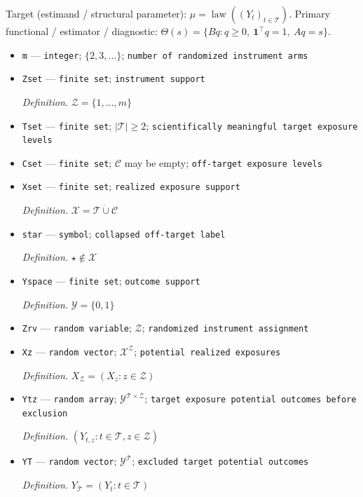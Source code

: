 \documentclass{article}
\begin{document}
Target (estimand / structural parameter): \(\mu=\operatorname{law}((Y_t)_{t\in\mathcal T})\).
Primary functional / estimator / diagnostic: \(\Theta(s)=\{Bq:q\ge0,\ \mathbf 1^\top q=1,\ Aq=s\}\).
\begin{itemize}
  \item \texttt{m} --- \texttt{integer}; \(\{2,3,\ldots\}\); \texttt{number of randomized instrument arms}
  \item \texttt{Zset} --- \texttt{finite set}; \texttt{instrument support}
  \par\smallskip\noindent\emph{Definition.} \(\mathcal Z=\{1,\ldots,m\}\)
  \item \texttt{Tset} --- \texttt{finite set}; \(|\mathcal T|\ge 2\); \texttt{scientifically meaningful target exposure levels}
  \item \texttt{Cset} --- \texttt{finite set}; \(\mathcal C\) may be empty; \texttt{off-\allowbreak{}target exposure levels}
  \item \texttt{Xset} --- \texttt{finite set}; \texttt{realized exposure support}
  \par\smallskip\noindent\emph{Definition.} \(\mathcal X=\mathcal T\mathbin{\dot\cup}\mathcal C\)
  \item \texttt{star} --- \texttt{symbol}; \texttt{collapsed off-\allowbreak{}target label}
  \par\smallskip\noindent\emph{Definition.} \(\star\notin\mathcal X\)
  \item \texttt{Yspace} --- \texttt{finite set}; \texttt{outcome support}
  \par\smallskip\noindent\emph{Definition.} \(\mathcal Y=\{0,1\}\)
  \item \texttt{Zrv} --- \texttt{random variable}; \(\mathcal Z\); \texttt{randomized instrument assignment}
  \item \texttt{Xz} --- \texttt{random vector}; \(\mathcal X^{\mathcal Z}\); \texttt{potential realized exposures}
  \par\smallskip\noindent\emph{Definition.} \(X_{\mathcal Z}=(X_z:z\in\mathcal Z)\)
  \item \texttt{Ytz} --- \texttt{random array}; \(\mathcal Y^{\mathcal T\times\mathcal Z}\); \texttt{target exposure potential outcomes before exclusion}
  \par\smallskip\noindent\emph{Definition.} \((Y_{t,z}:t\in\mathcal T,z\in\mathcal Z)\)
  \item \texttt{YT} --- \texttt{random vector}; \(\mathcal Y^{\mathcal T}\); \texttt{excluded target potential outcomes}
  \par\smallskip\noindent\emph{Definition.} \(Y_{\mathcal T}=(Y_t:t\in\mathcal T)\)

\end{itemize}
\end{document}
